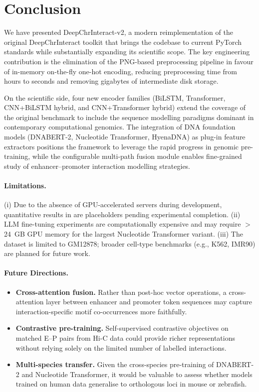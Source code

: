 \section{Conclusion}
\label{sec:conclusion}

We have presented DeepChrInteract-v2, a modern reimplementation of the original
DeepChrInteract toolkit that brings the codebase to current PyTorch standards while
substantially expanding its scientific scope.
The key engineering contribution is the elimination of the PNG-based preprocessing
pipeline in favour of in-memory on-the-fly one-hot encoding, reducing preprocessing
time from hours to seconds and removing gigabytes of intermediate disk storage.

On the scientific side, four new encoder families (BiLSTM, Transformer,
CNN+BiLSTM hybrid, and CNN+Transformer hybrid) extend the coverage of the original
benchmark to include the sequence modelling paradigms dominant in contemporary
computational genomics.
The integration of DNA foundation models (DNABERT-2, Nucleotide Transformer, HyenaDNA)
as plug-in feature extractors positions the framework to leverage the rapid progress
in genomic pre-training, while the configurable multi-path fusion module enables
fine-grained study of enhancer--promoter interaction modelling strategies.

\paragraph{Limitations.}
(i) Due to the absence of GPU-accelerated servers during development, quantitative
results in  are placeholders pending experimental completion.
(ii) LLM fine-tuning experiments are computationally expensive and may require
$>$24~GB GPU memory for the largest Nucleotide Transformer variant.
(iii) The dataset is limited to GM12878; broader cell-type benchmarks
(e.g., K562, IMR90) are planned for future work.

\paragraph{Future Directions.}
\begin{itemize}[noitemsep]
  \item \textbf{Cross-attention fusion.}
        Rather than post-hoc vector operations, a cross-attention layer between
        enhancer and promoter token sequences may capture interaction-specific
        motif co-occurrences more faithfully.
  \item \textbf{Contrastive pre-training.}
        Self-supervised contrastive objectives on matched E--P pairs from
        Hi-C data could provide richer representations without relying solely
        on the limited number of labelled interactions.
  \item \textbf{Multi-species transfer.}
        Given the cross-species pre-training of DNABERT-2 and Nucleotide Transformer,
        it would be valuable to assess whether models trained on human data generalise
        to orthologous loci in mouse or zebrafish.
\end{itemize}

